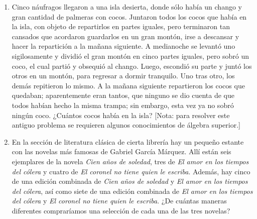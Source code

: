 \begin{Ejer}
\begin{enumerate}

\item Cinco n\'aufragos llegaron a una isla desierta, donde s\'olo hab\'ia un chango y gran cantidad de palmeras con cocos. Juntaron todos los cocos que hab\'ia en la isla, con objeto de repartirlos en partes iguales, pero terminaron tan cansados que acordaron guardarlos en un gran mont\'on, irse a descansar y hacer la repartici\'on a la ma\~nana siguiente. A medianoche se levant\'o uno sigilosamente y dividi\'o el gran mont\'on en cinco partes iguales, pero sobr\'o un coco, el cual parti\'o y obsequi\'o al chango. Luego, escondi\'o su parte y junt\'o los otros en un mont\'on, para regresar a dormir tranquilo. Uno tras otro, los dem\'as repitieron lo mismo. A la ma\~nana siguiente repartieron los cocos que quedaban; aparentemente eran tantos, que ninguno se dio cuenta de que todos hab\'ian hecho la misma trampa; sin embargo, esta vez ya no sobr\'o ning\'un coco. ¿Cu\'antos cocos hab\'ia en la isla? [Nota: para resolver este antiguo problema se requieren algunos conocimientos de \'algebra superior.]


\item En la secci\'on de literatura cl\'asica de cierta librer\'ia hay un peque\~no estante con las novelas m\'as famosas de Gabriel Garc\'ia M\'arquez. All\'i est\'an seis ejemplares de la novela \textit{Cien a\~nos de soledad}, tres de \textit{El amor en los tiempos del c\'olera} y cuatro de \textit{El coronel no tiene quien le escriba}. Adem\'as, hay cinco de una edici\'on combinada de \textit{Cien a\~nos de soledad} y \textit{El amor en los tiempos del c\'olera}, as\'i como siete de una edici\'on combinada de \textit{El amor en los tiempos del c\'olera} y \textit{El coronel no tiene quien le escriba}. ¿De cu\'antas maneras diferentes comprar\'iamos una selecci\'on de cada una de las tres novelas?


\end{enumerate}
\end{Ejer}
